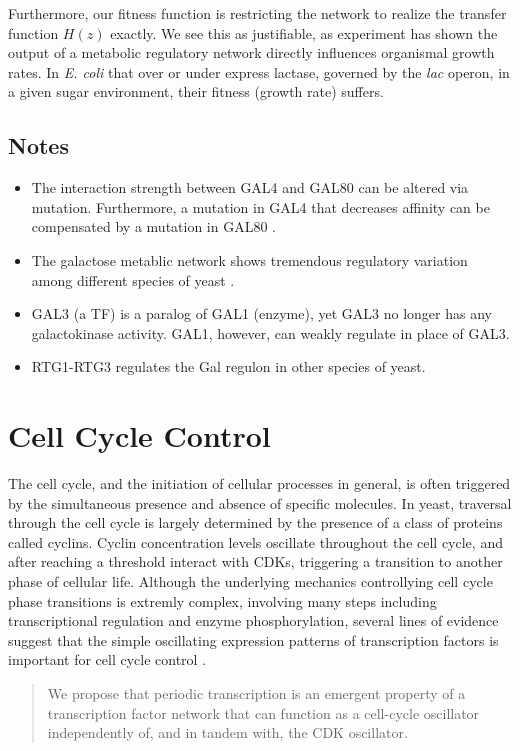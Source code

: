 \documentclass[11 pt]{article}
\begin{document}
    Furthermore, our fitness function is restricting the network to realize the transfer function $H(z)$ exactly. We see this as justifiable, as experiment has shown the output of a metabolic regulatory network directly influences organismal growth rates. In \citet{dekel2005optimality} \emph{E. coli} that over or under express lactase, governed by the \emph{lac} operon, in a given sugar environment, their fitness (growth rate) suffers.
    \subsection{Notes}
    \begin{itemize}
      \item The interaction strength between GAL4 and GAL80 can be altered via mutation. Furthermore, a mutation in GAL4 that decreases affinity can be compensated by a mutation in GAL80 \citep{li2010alterations, salmeron1990gal4, adhikari2014perturbation}.
      \item The galactose metablic network shows tremendous regulatory variation among different species of yeast \citep{lavoie2009rearrangements, martchenko2007transcriptional, dalal2016transcriptional, christensen2011unique, hartl2007induction, alam2013aspergillus}.
      \item GAL3 (a TF) is a paralog of GAL1 (enzyme), yet GAL3 no longer has any galactokinase activity. GAL1, however, can weakly regulate in place of GAL3.
      \item RTG1-RTG3 regulates the Gal regulon in other species of yeast. 
    \end{itemize}

    \section{Cell Cycle Control}
      The cell cycle, and the initiation of cellular processes in general, is often triggered by the simultaneous presence and absence of specific molecules. In yeast, traversal through the cell cycle is largely determined by the presence of a class of proteins called cyclins. Cyclin concentration levels oscillate throughout the cell cycle, and after reaching a threshold interact with CDKs, triggering a transition to another phase of cellular life. Although the underlying mechanics controllying cell cycle phase transitions is extremly complex, involving many steps including transcriptional regulation and enzyme phosphorylation, several lines of evidence suggest that the simple oscillating expression patterns of transcription factors is important for cell cycle control \citep{orlando2008global, simon2001serial}. 
      \begin{quote}
        We propose that periodic transcription is an emergent property of a transcription factor network that can function as a cell-cycle oscillator independently of, and in tandem with, the CDK oscillator. \citep{orlando2008global}
      \end{quote}
\end{document}
